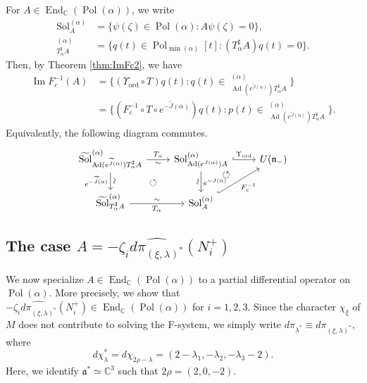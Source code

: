 \documentclass[a4paper,11pt,reqno]{amsart}
\newcommand{\fraka}{\mathfrak{a}}
\newcommand{\frakn}{\mathfrak{n}}
\newcommand{\CC}{\mathbb{C}}
\newcommand{\0}{{\bf 0}}
\newcommand{\C}{\mathbb{C}}
\newcommand{\1}{{\bf 1}}
\DeclareMathOperator{\Ad}{Ad}
\DeclareMathOperator{\End}{End}
\DeclareMathOperator{\Pol}{Pol}
\renewcommand\Im{\operatorname{Im}}
\newcommand{\ord}{{\mathrm{ord}}}
\DeclareMathOperator{\Sol}{Sol}
\newcommand{\wJ}{\widetilde{J}}
\DeclareMathOperator{\wSol}{\widetilde{\Sol}}
\theoremstyle{plain}
\theoremstyle{definition}
\numberwithin{equation}{section}
\theoremstyle{definition}
\begin{document}
For $A \in \End_\C(\Pol(\alpha))$, we write
\begin{align*}
\Sol_{A}^{(\alpha)}&=\{\psi(\zeta) \in \Pol(\alpha) : A\psi(\zeta) = 0\},\\
\wSol_{T_\alpha^\sharp A}^{(\alpha)}&=
\{q(t) \in \Pol_{\min(\alpha)}[t] : (T_\alpha^\sharp A)q(t)=0\}.
\end{align*}
Then, by Theorem \ref{thm:ImFc2}, we have
\begin{align*}
\Im F_c^{-1}(A)
&=\{(\Upsilon_{\ord} \circ T)q(t)
: q(t) \in \wSol_{\Ad(e^{\wJ(\alpha)})T_\alpha^\sharp A}^{(\alpha)}\}\\
&=\{(F_c^{-1}\circ T \circ e^{-\wJ(\alpha)})q(t) : p(t) \in 
\wSol_{\Ad(e^{\wJ(\alpha)})T_\alpha^\sharp A}^{(\alpha)}\}.
\end{align*}
Equivalently, the following diagram commutes.
\begin{equation}\label{eqn:cdA}
\begin{tikzcd}
	{\wSol_{\Ad(e^{\wJ(\alpha)})T_\alpha^\sharp A}^{(\alpha)}} & 
	\Sol_{\Ad(e^{J(\alpha)})A}^{(\alpha)}  	
	\arrow[dl, pos=0.5, phantom, "\circlearrowleft"]
	&{U(\frakn_-)} \\
	{\wSol_{T_\alpha^\sharp A}^{(\alpha)}}  & {\Sol_{A}^{(\alpha)}} &
	\arrow[ul, pos=0.886, phantom, "\circlearrowleft"]
	\arrow[r, "\Upsilon_{\ord}", hook, from=1-2, to=1-3]
	\arrow["F_c^{-1}"', hook, from=2-2, to=1-3]
	\arrow["{T_\alpha}", "\sim"' , from=1-1, to=1-2]
	\arrow["\sim" sloped, "e^{-\wJ(\alpha)}"', from=1-1, to=2-1]
	\arrow["e^{-J(\alpha)}", "\sim"' sloped,  from=1-2, to=2-2]
	\arrow["\sim" , "{T_\alpha}"',  from=2-1, to=2-2]
\end{tikzcd}
\end{equation}




\subsection{The case \texorpdfstring{$A=-\zeta_i\widehat{d\pi_{(\xi,\lambda)^*}}(N_i^+)$}{A=-ζdπ^}}
\label{sec:dpihat2}

We now specialize $A \in \End_{\CC}(\Pol(\alpha))$ 
to a partial differential operator on $\Pol(\alpha)$.
More precisely, we show 
that $-\zeta_i\widehat{d\pi_{(\xi,\lambda)^*}}(N_i^+) \in \End_\C(\Pol(\alpha))$
for $i=1,2,3$.
Since the character $\chi_\xi$ of $M$ does not contribute to solving the F-system, we simply write $d\pi_{\lambda^*} \equiv d\pi_{(\xi,\lambda)^*}$, where
\[
d\chi_\lambda^*=d\chi_{2\rho - \lambda}=(2-\lambda_1,-\lambda_2,-\lambda_3-2).
\]
Here, we identify $\fraka^* \simeq \C^3$ such that 
$2\rho = (2, 0, -2)$.
\end{document}
